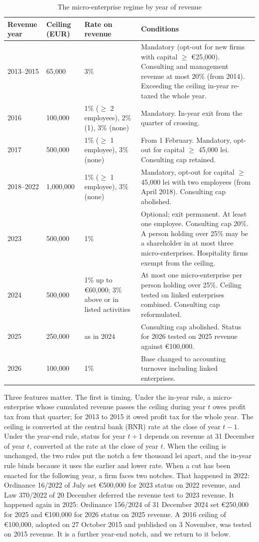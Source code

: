 \documentclass[12pt]{article}
\begin{document}
\begin{table}[!tbp]\centering\footnotesize
\caption{The micro-enterprise regime by year of revenue}\label{tab:regime}
\begin{tabular}{p{1.5cm}p{1.7cm}p{4.0cm}p{6.9cm}}\toprule
Revenue year & Ceiling (EUR) & Rate on revenue & Conditions \\ \midrule
2013--2015 & 65,000 & 3\% & Mandatory (opt-out for new firms with capital $\ge$ \euro{}25,000). Consulting and management revenue at most 20\% (from 2014). Exceeding the ceiling in-year re-taxed the whole year. \\
2016 & 100,000 & 1\% ($\ge$ 2 employees), 2\% (1), 3\% (none) & Mandatory. In-year exit from the quarter of crossing. \\
2017 & 500,000 & 1\% ($\ge$ 1 employee), 3\% (none) & From 1 February. Mandatory, opt-out for capital $\ge$ 45,000 lei. Consulting cap retained. \\
2018--2022 & 1,000,000 & 1\% ($\ge$ 1 employee), 3\% (none) & Mandatory, opt-out for capital $\ge$ 45,000 lei with two employees (from April 2018). Consulting cap abolished. \\
2023 & 500,000 & 1\% & Optional; exit permanent. At least one employee. Consulting cap 20\%. A person holding over 25\% may be a shareholder in at most three micro-enterprises. Hospitality firms exempt from the ceiling. \\
2024 & 500,000 & 1\% up to \euro{}60,000; 3\% above or in listed activities & At most one micro-enterprise per person holding over 25\%. Ceiling tested on linked enterprises combined. Consulting cap reformulated. \\
2025 & 250,000 & as in 2024 & Consulting cap abolished. Status for 2026 tested on 2025 revenue against \euro{}100,000. \\
2026 & 100,000 & 1\% & Base changed to accounting turnover including linked enterprises. \\ \bottomrule
\end{tabular}
\end{table}

Three features matter. The first is timing. Under the in-year rule, a micro-enterprise whose cumulated revenue passes the ceiling during year $t$ owes profit tax from that quarter; for 2013 to 2015 it owed profit tax for the whole year. The ceiling is converted at the central bank (BNR) rate at the close of year $t-1$. Under the year-end rule, status for year $t+1$ depends on revenue at 31 December of year $t$, converted at the rate at the close of year $t$. When the ceiling is unchanged, the two rules put the notch a few thousand lei apart, and the in-year rule binds because it uses the earlier and lower rate. When a cut has been enacted for the following year, a firm faces two notches. That happened in 2022: Ordinance 16/2022 of July set \euro{}500,000 for 2023 status on 2022 revenue, and Law 370/2022 of 20 December deferred the revenue test to 2023 revenue. It happened again in 2025: Ordinance 156/2024 of 31 December 2024 set \euro{}250,000 for 2025 and \euro{}100,000 for 2026 status on 2025 revenue. A 2016 ceiling of \euro{}100,000, adopted on 27 October 2015 and published on 3 November, was tested on 2015 revenue. It is a further year-end notch, and we return to it below.
\end{document}
